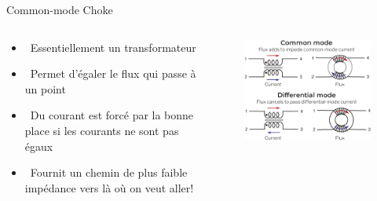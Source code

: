 \begin{frame}{Common-mode Choke}
    \begin{columns}
        \begin{column}{0.45\textwidth}
            \begin{itemize}
                \item[] \textcolor{UDSgreenFierte}{\faUnlink}
                    ~Essentiellement un transformateur
                \item[] \textcolor{UDSgreenFierte}{\faSync}
                    ~Permet d'égaler le flux qui passe à un point
                \item[] \textcolor{UDSgreenFierte}{\faExchange*}
                    ~Du courant est forcé par la bonne place si les courants ne sont pas égaux
                \bigskip
                \item[] \textcolor{UDSgreenFierte}{\faLongArrowAltRight}
                    ~Fournit un chemin de plus faible impédance vers là où on veut aller!
            \end{itemize}
        \end{column}
        \begin{column}{0.55\textwidth}
            \begin{figure}
                \includegraphics[width=\textwidth, height=0.75\textheight, keepaspectratio]{pictures/common-mode-choke.png}
            \end{figure}
        \end{column}
    \end{columns}
\end{frame}

